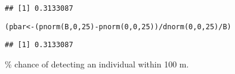 \documentclass[color=usenames,dvipsnames]{beamer}\usepackage[]{graphicx}\usepackage[]{color}
\makeatletter
\newcommand{\hlnum}[1]{\textcolor[rgb]{0.69,0.494,0}{#1}}%
\newcommand{\hlopt}[1]{\textcolor[rgb]{0,0,0}{#1}}%
\newcommand{\hlstd}[1]{\textcolor[rgb]{0,0,0}{#1}}%
\newcommand{\hlkwb}[1]{\textcolor[rgb]{0,0.341,0.682}{#1}}%
\newcommand{\hlkwd}[1]{\textcolor[rgb]{0.004,0.004,0.506}{#1}}%
\newenvironment{kframe}{%
 \def\at@end@of@kframe{}%
 \ifinner\ifhmode%
  \def\at@end@of@kframe{\end{minipage}}%
  \begin{minipage}{\columnwidth}%
 \fi\fi%
 \def\FrameCommand##1{\hskip\@totalleftmargin \hskip-\fboxsep
 \colorbox{shadecolor}{##1}\hskip-\fboxsep
     \hskip-\linewidth \hskip-\@totalleftmargin \hskip\columnwidth}%
 \MakeFramed {\advance\hsize-\width
   \@totalleftmargin\z@ \linewidth\hsize
   \@setminipage}}%
 {\par\unskip\endMakeFramed%
 \at@end@of@kframe}
\newenvironment{knitrout}{}{} %
\makeatother
\begin{document}
\begin{frame}[fragile]
\begin{knitrout}
\begin{kframe}
\begin{verbatim}
## [1] 0.3133087
\end{verbatim}
\begin{alltt}
\hlstd{(pbar} \hlkwb{<-} \hlstd{(}\hlkwd{pnorm}\hlstd{(B,}\hlnum{0}\hlstd{,}\hlnum{25}\hlstd{)} \hlopt{-} \hlkwd{pnorm}\hlstd{(}\hlnum{0}\hlstd{,}\hlnum{0}\hlstd{,}\hlnum{25}\hlstd{))} \hlopt{/} \hlkwd{dnorm}\hlstd{(}\hlnum{0}\hlstd{,}\hlnum{0}\hlstd{,}\hlnum{25}\hlstd{)} \hlopt{/} \hlstd{B)}
\end{alltt}
\begin{verbatim}
## [1] 0.3133087
\end{verbatim}
\end{kframe}
\end{knitrout}
\pause
\vfill
{}\% chance of detecting an individual within 100 m. \\
\end{frame}
\end{document}

